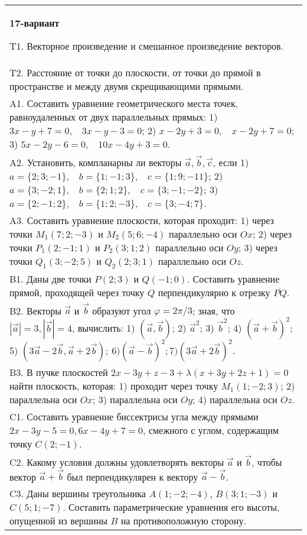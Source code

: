 \documentclass{article}
\begin{document}
\begin{tabular}{m{17cm}}
\textbf{17-вариант}
\newline

T1. 
Векторное произведение и смешанное произведение векторов.
 \\
T2. 
Расстояние от точки до плоскости, от точки до прямой в пространстве и между двумя скрещивающими прямыми. \\
A1. 
Составить уравнение геометрического места точек, равноудаленных от двух параллельных прямых: 1) \(3x - y + 7 = 0,\ \ \ \ 3x - y - 3 = 0\); 2) \(x - 2y + 3 = 0,\ \ \ \ x - 2y + 7 = 0\); 3) \(5x - 2y - 6 = 0,\ \ \ \ 10x - 4y + 3 = 0\).
 \\
A2. 
Установить, компланарны ли векторы \(\overrightarrow{a},\overrightarrow{b},\overrightarrow{c}\), если 1)\(a = \{ 2;3; - 1\},\ \ \ \ b = \{ 1; - 1;3\},\ \ \ \ c = \{ 1;9; - 11\}\); 2)\(a = \{ 3; - 2;1\},\ \ \ \ b = \{ 2;1;2\},\ \ \ \ c = \{ 3; - 1; - 2\}\); 3)\(a = \{ 2; - 1;2\},\ \ \ \ b = \{ 1;2; - 3\},\ \ \ \ c = \{ 3; - 4;7\}\). \\
A3. 
Составить уравнение плоскости, которая проходит: 1) через точки \(M_{1}(7;2; - 3)\) и \(M_{2}(5;6; - 4)\) параллельно оси \(Ox\); 2) через точки \(P_{1}(2; - 1;1)\) и \(P_{2}(3;1;2)\) параллельно оси \(Oy\); 3) через точки \(Q_{1}(3; - 2;5)\) и \(Q_{2}(2;3;1)\) параллельно оси \(Oz\).
 \\
B1. 
Даны две точки \(P(2;3)\) и \(Q( - 1;0)\). Составить уравнение прямой, проходящей через точку \(Q\) перпендикулярно к отрезку \(\overline{PQ}\).
 \\
B2. 
Векторы \(\overrightarrow{a}\) и \(\overrightarrow{b}\) образуют угол \(\varphi = 2\pi/3\); зная, что \(|\overrightarrow{a}| = 3,|\overrightarrow{b}| = 4\), вычислить: 1) \(\left( \overrightarrow{a},\overrightarrow{b} \right)\); 2) \({\overrightarrow{a}}^{2}\); 3) \({\overrightarrow{b}}^{2}\); 4) \((\overrightarrow{a} + \overrightarrow{b})^{2}\); 5) \(\left( 3\overrightarrow{a} - 2\overrightarrow{b},\overrightarrow{a} + 2\overrightarrow{b} \right);\ 6)(\overrightarrow{a} - \overrightarrow{b})^{2};7)(3\overrightarrow{a} + 2\overrightarrow{b})^{2}\).
 \\
B3. 
В пучке плоскостей \(2x - 3y + z - 3 + \lambda(x + 3y + 2z + 1) = 0\) найти плоскость, которая: 1) проходит через точку \(M_{1}(1; - 2;3)\); 2) параллельна оси \(Ox\); 3) параллельна оси \(Oy\); 4) параллельна оси \(Oz\).
 \\
C1. 
Составить уравнение биссектрисы угла между прямыми \(2x - 3y - 5 = 0,6x - 4y + 7 = 0\), смежного с углом, содержащим точку \(C(2; - 1)\).
 \\
C2. 
Какому условия должны удовлетворять векторы \(\overrightarrow{a}\) и \(\overrightarrow{b}\), чтобы вектор \(\overrightarrow{a} + \overrightarrow{b}\) был перпендикулярен к вектору \(\overrightarrow{a} - \overrightarrow{b}\).
 \\
C3. 
Даны вершины треугольника \(A(1; - 2; - 4)\), \(B(3;1; - 3)\) и \(C(5;1; - 7)\). Составить параметрические уравнения его высоты, опущенной из вершины \(B\) на противоположную сторону.
 \\

\end{tabular}
\vspace{1cm}
\end{document}

